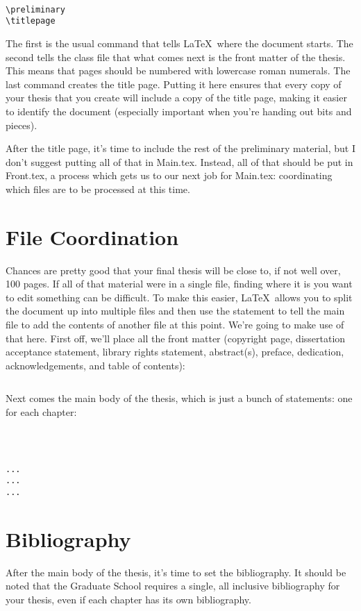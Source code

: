 \begin{verbatim}

\preliminary
\titlepage
\end{verbatim}

The first is the usual command that tells \LaTeX\ where the document starts.  The second tells the class file that what comes next is the front matter of the thesis.  This means that pages should be numbered with lowercase roman numerals.  The last command creates the title page.  Putting it here ensures that every copy of your thesis that you create will include a copy of the title page, making it easier to identify the document (especially important when you're handing out bits and pieces).

After the title page, it's time to include the rest of the preliminary material, but I don't suggest putting all of that in Main.tex.  Instead, all of that should be put in Front.tex, a process which gets us to our next job for Main.tex: coordinating which files are to be processed at this time.

\section{File Coordination}
Chances are pretty good that your final thesis will be close to, if not well over, 100 pages.  If all of that material were in a single file, finding where it is you want to edit something can be difficult.  To make this easier, \LaTeX\ allows you to split the document up into multiple files and then use the \verb== statement to tell the main file to add the contents of another file at this point.  We're going to make use of that here.  First off, we'll place all the front matter (copyright page, dissertation acceptance statement, library rights statement, abstract(s), preface, dedication, acknowledgements, and table of contents):

\begin{verbatim}

\end{verbatim}

Next comes the main body of the thesis, which is just a bunch of \verb== statements: one for each chapter:

\begin{verbatim}



...
...
...
\end{verbatim}

\section{Bibliography}\label{bib}
After the main body of the thesis, it's time to set the bibliography.  It should be noted that the Graduate School requires a single, all inclusive bibliography for your thesis, even if each chapter has its own bibliography.

